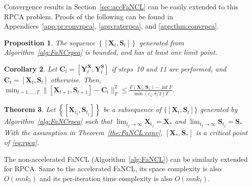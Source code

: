 \documentclass[10pt,journal,compsoc]{IEEEtran}
\newtheorem{theorem}{Theorem}[section]
\newtheorem{prop}[theorem]{Proposition}
\newtheorem{corollary}[theorem]{Corollary}
\newcommand{\X}{\mathbf{X}}
\newcommand{\NM}[2]{\| #1 \|_{#2} }
\begin{document}
Convergence results 
in Section~\ref{sec:accFaNCL}
can be easily extended to this RPCA problem.
Proofs of the following can be found in Appendices~\ref{app:pr:convrpca},
\ref{app:raterpca}, and
\ref{app:thm:convrpca}.

\begin{prop} \label{pr:convrpca}
	The sequence $\left\lbrace [ \X_t, \mathbf{S}_t ] \right\rbrace$ generated from Algorithm~\ref{alg:FaNCrpca} is bounded,
	and has at least one limit point.
\end{prop}

\begin{corollary} \label{cor:raterpca}
	Let $\mathbf{C}_t = \left[ \mathbf{Y}^{\mathbf{X}}_t, \mathbf{Y}^{\mathbf{S}}_t \right]$ if
	steps~10 and 11 are performed,
	and $\mathbf{C}_t = [\X_t, \mathbf{S}_t]$ otherwise.
	Then, $\min_{t = 1, \dots, T} \NM{[\X_{t + 1}, \mathbf{S}_{t + 1}] - \mathbf{C}_t}{F}^2 \! \le \! \frac{F(\X_1, \mathbf{S}_1) - \inf F}{\min(c_1, \delta/2) T}$. 
\end{corollary}

\begin{theorem} \label{thm:convrpca}
Let $\left\lbrace  [\X_{t_j}, \mathbf{S}_{t_j}] \right\rbrace$ be
a subsequence of $\{[\X_t, \mathbf{S}_t]\}$ generated by
Algorithm~\ref{alg:FaNCrpca} such that
$\lim_{t_j \rightarrow \infty} \X_{t_j} = \X_*$
and $\lim_{t_j \rightarrow \infty} \mathbf{S}_{t_j} = \mathbf{S}_*$
With the assumption in Theorem~\ref{the:FaNCL:conv},
$[\X_*, \mathbf{S}_*]$ is a critical point of \eqref{eq:rpca}.
\end{theorem}

The non-accelerated \textsf{FaNCL} (Algorithm~\ref{alg:FaNCL}) can be 
similarly
extended for RPCA.
Same to the accelerated \textsf{FaNCL},
its space complexity is also 
$O( m n k_t )$ 
and 
its per-iteration time complexity
is also
$O( m n k_t )$.



\begin{figure*}[ht]
\centering

\vspace{-10px}
\caption{Parallelization of different matrix operations. Here, the number of
	threads  $q$ is equal to 3. Each dotted path denotes operation of a thread.}
\label{fig:threetype}
\end{figure*}
\end{document}
